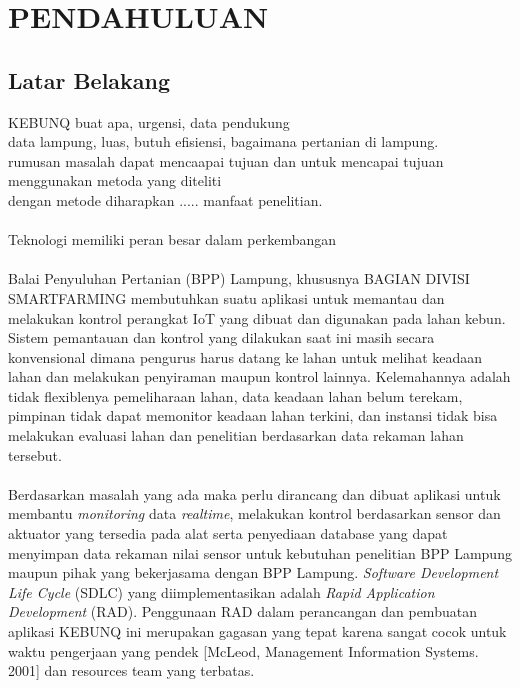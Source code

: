 \chapter{PENDAHULUAN}

\vspace{4.5pt}

\begin{flushleft}
    \section{Latar Belakang} 

\begin{justify}
  \noindent 
  
  KEBUNQ buat apa, urgensi, data pendukung\\
  data lampung, luas, butuh efisiensi, bagaimana pertanian di lampung.\\
  rumusan masalah dapat mencaapai tujuan dan untuk mencapai tujuan menggunakan metoda yang diteliti\\
  dengan metode diharapkan ..... manfaat penelitian.
  \\
  \\
  Teknologi memiliki peran besar dalam perkembangan
  \\
  \\
  Balai Penyuluhan Pertanian (BPP) Lampung, khususnya BAGIAN DIVISI SMARTFARMING membutuhkan suatu aplikasi untuk memantau dan melakukan kontrol
  perangkat IoT yang dibuat dan digunakan pada lahan kebun. Sistem pemantauan dan kontrol yang dilakukan saat ini
  masih secara konvensional dimana pengurus harus datang ke lahan untuk melihat keadaan lahan dan melakukan penyiraman maupun kontrol lainnya. Kelemahannya adalah tidak flexiblenya pemeliharaan lahan, data keadaan lahan belum terekam,
  pimpinan tidak dapat memonitor keadaan lahan terkini, dan instansi tidak bisa melakukan evaluasi lahan dan penelitian berdasarkan data rekaman lahan tersebut.
  \\
  \\
  Berdasarkan masalah yang ada maka perlu dirancang dan dibuat aplikasi untuk membantu
\textit{monitoring} data \textit{realtime}, melakukan kontrol berdasarkan sensor dan aktuator yang tersedia pada alat serta penyediaan database yang dapat menyimpan data rekaman nilai sensor untuk kebutuhan
penelitian BPP Lampung maupun pihak yang bekerjasama dengan BPP Lampung. \textit{Software Development Life Cycle} (SDLC) yang diimplementasikan adalah
\textit{Rapid Application Development} (RAD). Penggunaan RAD dalam perancangan dan pembuatan aplikasi KEBUNQ ini merupakan gagasan yang tepat karena sangat cocok untuk 
waktu pengerjaan yang pendek [McLeod, Management Information Systems. 2001] dan resources team yang terbatas.


\end{justify}
\end{flushleft}
